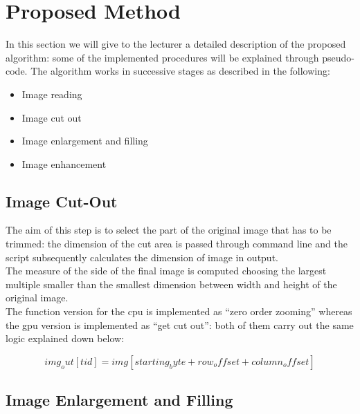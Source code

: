 \section{Proposed Method}

In this section we will give to the lecturer a detailed description of the proposed algorithm: some of the implemented procedures will be explained through pseudo-code. 
The algorithm works in successive stages as described in the following:

\begin{itemize}
    \item Image reading
    \item Image cut out
    \item Image enlargement and filling
    \item Image enhancement
\end{itemize}

    \subsection{Image Cut-Out}
    The aim of this step is to select the part of the original image that has to be trimmed: the dimension of the cut area is passed through command line and the script subsequently calculates the dimension of image in output.  \\ 
    The measure of the side of the final image is computed choosing the largest multiple smaller than the smallest dimension between width and height of the original image.\\
    The function version for the cpu is implemented as “zero order zooming” whereas the gpu version is implemented as “get cut out”: both of them carry out the same logic explained down below:

    \begin{equation}
        img_out[tid] = img[starting_byte + row_offset + column_offset]
    \end{equation}

    \subsection{Image Enlargement and Filling}

